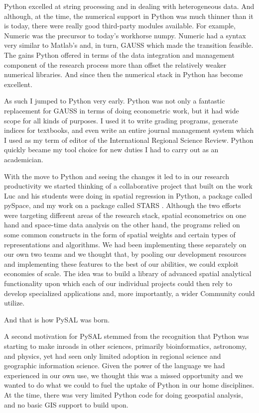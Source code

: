 \documentclass[11pt]{article}
\begin{document}
Python excelled at string processing and in dealing with heterogeneous data.
And although, at the time, the numerical support in Python was much thinner
than it is today, there were really good third-party modules available. For
example, Numeric was the precursor to today's workhorse numpy. Numeric had a
syntax very similar to Matlab's and, in turn, GAUSS which made the transition
feasible. The gains Python offered in terms of the data integration and management
component of the research process more than offset the relatively weaker
numerical libraries. And since then the numerical stack in Python has become
excellent.

As such I jumped to Python very early. Python was not only a fantastic
replacement for GAUSS in terms of doing econometric work, but it had wide scope
for all kinds of purposes. I used it to write grading programs, generate
indices for textbooks, and even write an entire journal management system which
I used as my term of editor of the International Regional Science Review.
Python quickly became my tool choice for new duties I had to carry out as an
academician. 

With the move to Python and seeing the changes it led to in our research
productivity we started thinking of a collaborative project that built on the
work Luc and his students were doing in spatial regression in Python, a package
called pySpace, and my work on a package called STARS \citep{rey_stars:_2006-3}.
Although the two efforts were targeting different areas of the research stack,
spatial econometrics on one hand and space-time data analysis on the other
hand, the programs relied on some common constructs in the form of spatial
weights and certain types of representations and algorithms. We had been
implementing these separately on our own two teams and we thought that, by
pooling our development resources and implementing these features to the best
of our abilities, we could exploit economies of scale. The idea was to build a
library of advanced spatial analytical functionality upon which each of our
individual projects could then rely to develop specialized applications and,
more importantly, a wider Community could utilize.


And that is how PySAL was born.

A second motivation for PySAL stemmed from the recognition that Python was
starting to make inroads in other sciences, primarily bioinformatics,
astronomy, and physics, yet had seen only limited adoption in regional science
and geographic information science. Given the power of the language we had
experienced in our own use, we thought this was a missed opportunity and we
wanted to do what we could to fuel the uptake of Python in our home
disciplines. At the time, there was very limited Python code for doing
geospatial analysis, and no basic GIS support to build upon.
\end{document}
